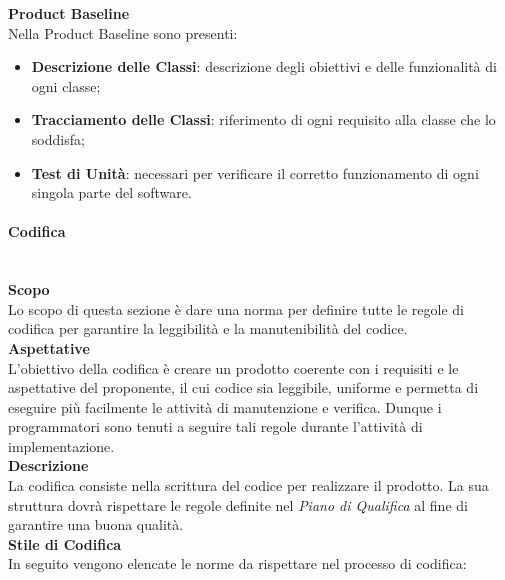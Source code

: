 \textbf{Product Baseline}\\
Nella Product Baseline sono presenti:
\begin{itemize}
	\item \textbf{Descrizione delle Classi}: descrizione degli obiettivi e delle funzionalità di ogni classe;
	\item \textbf{Tracciamento delle Classi}: riferimento di ogni requisito alla classe che lo soddisfa;
	\item \textbf{Test di Unità}: necessari per verificare il corretto funzionamento di ogni singola parte del software.
\end{itemize}
\paragraph{Codifica}\mbox{}\\ [1mm]
\textbf{Scopo}\\
Lo scopo di questa sezione è dare una norma per definire tutte le regole di codifica per garantire la leggibilità e la manutenibilità del codice.
\\\textbf{Aspettative}\\
L'obiettivo della codifica è creare un prodotto coerente con i requisiti e le aspettative del proponente, il cui codice sia leggibile, uniforme e permetta di eseguire più facilmente le attività di manutenzione e verifica. Dunque i programmatori sono tenuti a seguire tali regole durante l'attività di implementazione.
\\\textbf{Descrizione}\\
La codifica consiste nella scrittura del codice per realizzare il prodotto. La sua struttura dovrà rispettare le regole definite nel \textit{Piano di Qualifica} al fine di garantire una buona qualità.
\\\textbf{Stile di Codifica}\\
In seguito vengono elencate le norme da rispettare nel processo di codifica:
